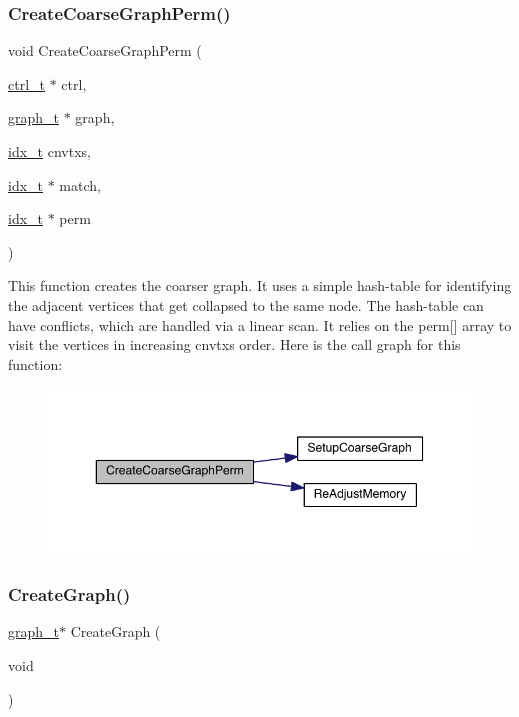 \subsubsection{\texorpdfstring{Create\+Coarse\+Graph\+Perm()}{CreateCoarseGraphPerm()}}
{\footnotesize\ttfamily void Create\+Coarse\+Graph\+Perm (\begin{DoxyParamCaption}\item[{\hyperlink{a00742}{ctrl\+\_\+t} $\ast$}]{ctrl,  }\item[{\hyperlink{a00734}{graph\+\_\+t} $\ast$}]{graph,  }\item[{\hyperlink{a00876_aaa5262be3e700770163401acb0150f52}{idx\+\_\+t}}]{cnvtxs,  }\item[{\hyperlink{a00876_aaa5262be3e700770163401acb0150f52}{idx\+\_\+t} $\ast$}]{match,  }\item[{\hyperlink{a00876_aaa5262be3e700770163401acb0150f52}{idx\+\_\+t} $\ast$}]{perm }\end{DoxyParamCaption})}

This function creates the coarser graph. It uses a simple hash-\/table for identifying the adjacent vertices that get collapsed to the same node. The hash-\/table can have conflicts, which are handled via a linear scan. It relies on the perm\mbox{[}\mbox{]} array to visit the vertices in increasing cnvtxs order. Here is the call graph for this function\+:\nopagebreak
\begin{figure}[H]
\begin{center}
\leavevmode
\includegraphics[width=350pt]{a00945_a0aba484ba693edd6d56426d04bd7fd4b_cgraph}
\end{center}
\end{figure}
\mbox{\label{a00945_a01903fa912de9fc7f01dace993a3fc85}} 
\subsubsection{\texorpdfstring{Create\+Graph()}{CreateGraph()}}
{\footnotesize\ttfamily \hyperlink{a00734}{graph\+\_\+t}$\ast$ Create\+Graph (\begin{DoxyParamCaption}\item[{void}]{ }\end{DoxyParamCaption})}

